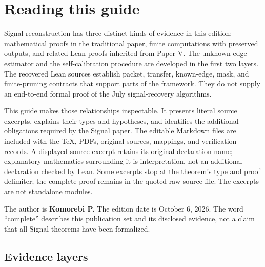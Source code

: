 \documentclass[11pt]{article}
\begin{document}
\KomorebiCover
{}

\hypersetup{pageanchor=false}

\hypersetup{pageanchor=true}
\setcounter{tocdepth}{1}
\begingroup\small\setlength{\parskip}{0pt}\tableofcontents\endgroup\clearpage
\hypertarget{reading-this-guide}{%
\section{Reading this guide}\label{reading-this-guide}}

Signal reconstruction has three distinct kinds of evidence in this edition: mathematical proofs in the traditional paper, finite computations with preserved outputs, and related Lean proofs inherited from Paper V. The unknown-edge estimator and the self-calibration procedure are developed in the first two layers. The recovered Lean sources establish packet, transfer, known-edge, mask, and finite-pruning contracts that support parts of the framework. They do not supply an end-to-end formal proof of the July signal-recovery algorithms.

This guide makes those relationships inspectable. It presents literal source excerpts, explains their types and hypotheses, and identifies the additional obligations required by the Signal paper. The editable Markdown files are included with the TeX, PDFs, original sources, mappings, and verification records. A displayed source excerpt retains its original declaration name; explanatory mathematics surrounding it is interpretation, not an additional declaration checked by Lean. Some excerpts stop at the theorem's type and proof delimiter; the complete proof remains in the quoted raw source file. The excerpts are not standalone modules.

The author is \textbf{Komorebi P.} The edition date is October 6, 2026. The word ``complete'' describes this publication set and its disclosed evidence, not a claim that all Signal theorems have been formalized.

\hypertarget{evidence-layers}{%
\subsection{Evidence layers}\label{evidence-layers}}
\end{document}
